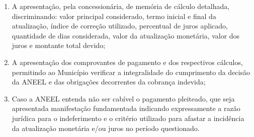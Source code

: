\begin{enumerate}[resume]
\begin{enumerate}
        \item A apresentação, pela concessionária, de memória de cálculo detalhada, discriminando: valor principal considerado, termo inicial e final da atualização, índice de correção utilizado, percentual de juros aplicado, quantidade de dias considerada, valor da atualização monetária, valor dos juros e montante total devido;

        \item A apresentação dos comprovantes de pagamento e dos respectivos cálculos, permitindo ao Município verificar a integralidade do cumprimento da decisão da ANEEL e das obrigações decorrentes da cobrança indevida;

        \item Caso a ANEEL entenda não ser cabível o pagamento pleiteado, que seja apresentada manifestação fundamentada indicando expressamente a razão jurídica para o indeferimento e o critério utilizado para afastar a incidência da atualização monetária e/ou juros no período questionado.
    \end{enumerate}
\end{enumerate}